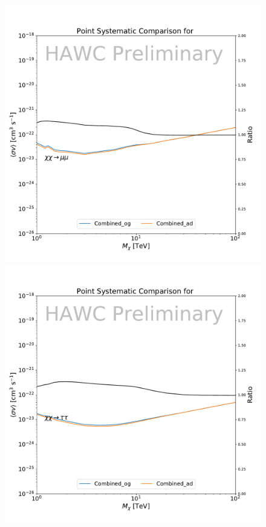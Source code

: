 \begin{figure}[h]
{        \includegraphics[scale=0.21]{figures/glory_duck/hawc/PointingSystematic_GD_Combined_mumu.pdf}
        \includegraphics[scale=0.21]{figures/glory_duck/hawc/PointingSystematic_GD_Combined_tautau.pdf}
}
\end{figure}
